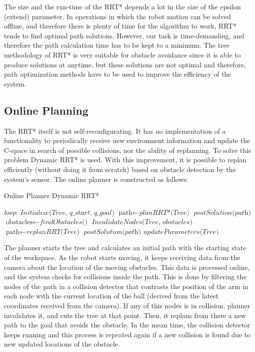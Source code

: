 The size and the run-time of the RRT* depends a lot in the size of the epsilon (extend) parameter. In operations in which the robot motion can be solved offline, and therefore there is plenty of time for the algorithm to work, RRT* tends to find optimal path solutions. However, our task is time-demanding, and therefore the path calculation time has to be kept to a minimum. The tree methodology of RRT* is very suitable for obstacle avoidance since it is able to produce solutions at anytime, but these solutions are not optimal and therefore, path optimization methods have to be used to improve the efficiency of the system.


\subsection{Online Planning}
\label{sec:onl}

The RRT* itself is not self-reconfigurating. It has no implementation of a functionality to periodically receive new environment information and update the C-space in search of possible collisions, nor the ability of replanning. To solve this problem Dynamic RRT* is used. With this improvement, it is possible to replan efficiently (without doing it from scratch) based on obstacle detection by the system's sensor. The online planner is constructed as follows:\\

\begin{algorithm}
\caption{Online Planner Dynamic RRT*}\label{planner}
\begin{algorithmic}[1]
\State \emph{loop}:
    \State $\textit{Initialize(Tree, q\_start, q\_goal)}$
    \State $\text{path} \gets \textit{planRRT*(Tree)}$
    \State $\textit{postSolution(path)}$
    \State $\text{obstacles} \gets \textit{findObstacles()}$
        \State  $\textit{InvalidateNodes(Tree, obstacles)}$
    \EndFor
            \State $\text{path} \gets \textit{replanRRT(Tree)}$
            \State $\textit{postSolution(path)}$
        \EndIf 
    \State $\textit{updateParameters(Tree)}$
\EndProcedure
\end{algorithmic}
\end{algorithm}

The planner starts the tree and calculates an initial path with the starting state of the workspace. As the robot starts moving, it keeps receiving data from the camera about the location of the moving obstacles. This data is processed online, and the system checks for collisions inside the path. This is done by filtering the nodes of the path in a collision detector that contrasts the position of the arm in each node with the current location of the ball (derived from the latest coordinates received from the camera). If any of this nodes is in collision, planner invalidates it, and cuts the tree at that point. Then, it replans from there a new path to the goal that avoids the obstacle. In the mean time, the collision detector keeps running and this process is repeated again if a new collision is found due to new updated locations of the obstacle.  \\

